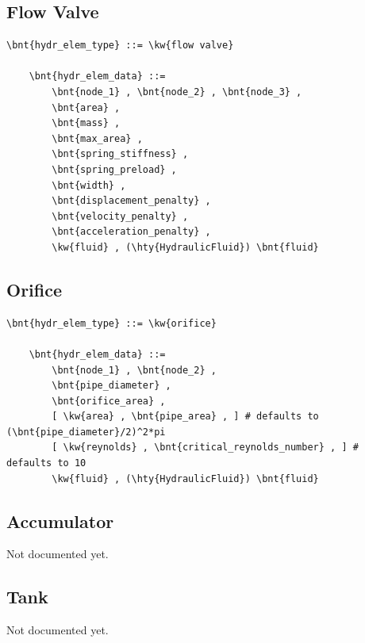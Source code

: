 \subsection{Flow Valve}
\label{sec:EL:HYDR:FLOW_VALVE}
\begin{Verbatim}[commandchars=\\\{\}]
    \bnt{hydr_elem_type} ::= \kw{flow valve}

    \bnt{hydr_elem_data} ::=
        \bnt{node_1} , \bnt{node_2} , \bnt{node_3} ,
        \bnt{area} ,
        \bnt{mass} ,
        \bnt{max_area} ,
        \bnt{spring_stiffness} ,
        \bnt{spring_preload} ,
        \bnt{width} ,
        \bnt{displacement_penalty} ,
        \bnt{velocity_penalty} ,
        \bnt{acceleration_penalty} ,
        \kw{fluid} , (\hty{HydraulicFluid}) \bnt{fluid}
\end{Verbatim}



\subsection{Orifice}
\label{sec:EL:HYDR:ORIFICE}
\begin{Verbatim}[commandchars=\\\{\}]
    \bnt{hydr_elem_type} ::= \kw{orifice}

    \bnt{hydr_elem_data} ::=
        \bnt{node_1} , \bnt{node_2} ,
        \bnt{pipe_diameter} ,
        \bnt{orifice_area} ,
        [ \kw{area} , \bnt{pipe_area} , ] # defaults to (\bnt{pipe_diameter}/2)^2*pi
        [ \kw{reynolds} , \bnt{critical_reynolds_number} , ] # defaults to 10
        \kw{fluid} , (\hty{HydraulicFluid}) \bnt{fluid}
\end{Verbatim}



\subsection{Accumulator}
\label{sec:EL:HYDR:ACCUMULATOR}
Not documented yet.



\subsection{Tank}
\label{sec:EL:HYDR:TANK}
Not documented yet.




